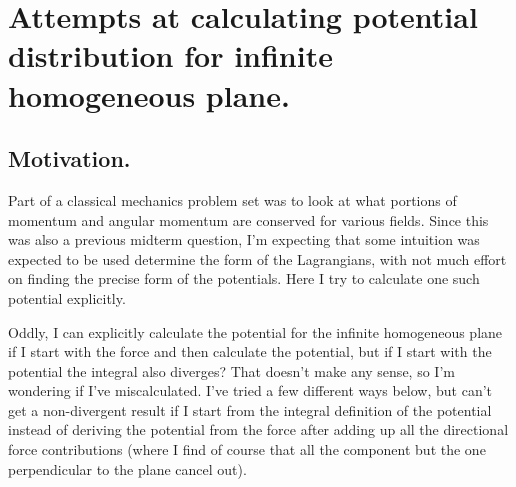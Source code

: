 %
%

\chapter{Attempts at calculating potential distribution for infinite homogeneous plane.}
\label{chap:infiniteSheetPotentials}
{}
\date{Feb 19, 2012}

\beginArtWithToc

\section{Motivation.}

Part of a classical mechanics problem set was to look at what portions of momentum and angular momentum are conserved for various fields.  Since this was also a previous midterm question, I'm expecting that some intuition was expected to be used determine the form of the Lagrangians, with not much effort on finding the precise form of the potentials.  Here I try to calculate one such potential explicitly.


Oddly, I can explicitly calculate the potential for the infinite homogeneous plane if I start with the force and then calculate the potential, but if I start with the potential the integral also diverges?  That doesn't make any sense, so I'm wondering if I've miscalculated.  I've tried a few different ways below, but can't get a non-divergent result if I start from the integral definition of the potential instead of deriving the potential from the force after adding up all the directional force contributions (where I find of course that all the component but the one perpendicular to the plane cancel out).
%

